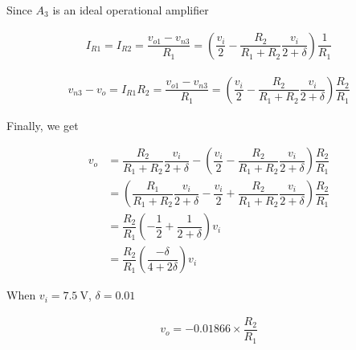 \documentclass{article}
\begin{document}
Since $A_3$ is an ideal operational amplifier

\begin{equation*}
  \begin{aligned}
    I_{R1} = I_{R2} = \dfrac{v_{o1} - v_{n3}}{R_1} =  \left( \dfrac{v_i}{2} - \dfrac{R_2}{R_1 + R_2} \dfrac{v_i}{2 + \delta} \right) \dfrac{1}{R_1} 
  \end{aligned}
\end{equation*}

\begin{equation*}
  \begin{aligned}
    v_{n3} - v_o = I_{R1} R_2 = \dfrac{v_{o1} - v_{n3}}{R_1} =  \left( \dfrac{v_i}{2} - \dfrac{R_2}{R_1 + R_2} \dfrac{v_i}{2 + \delta} \right) \dfrac{R_2}{R_1} 
  \end{aligned}
\end{equation*}

Finally, we get

\begin{equation*}
  \begin{aligned}
    v_o &= \dfrac{R_2}{R_1 + R_2} \dfrac{v_i}{2 + \delta} - \left( \dfrac{v_i}{2} - \dfrac{R_2}{R_1 + R_2} \dfrac{v_i}{2 + \delta} \right) \dfrac{R_2}{R_1} \\
    &= \left( \dfrac{R_1}{R_1 + R_2} \dfrac{v_i}{2 + \delta} - \dfrac{v_i}{2} + \dfrac{R_2}{R_1 + R_2} \dfrac{v_i}{2 + \delta} \right) \dfrac{R_2}{R_1} \\
    &= \dfrac{R_2}{R_1} \left( - \dfrac{1}{2} + \dfrac{1}{2 + \delta} \right) v_i \\
    &= \dfrac{R_2}{R_1} \left( \dfrac{- \delta}{4 + 2 \delta}  \right) v_{i} 
  \end{aligned}
\end{equation*}

When $v_i = 7.5 \  \mathrm{V}$, $\delta = 0.01$

\begin{equation*}
  \begin{aligned}
    v_o = - 0.01866 \times \dfrac{R_2}{R_1} 
  \end{aligned}
\end{equation*}
\end{document}
